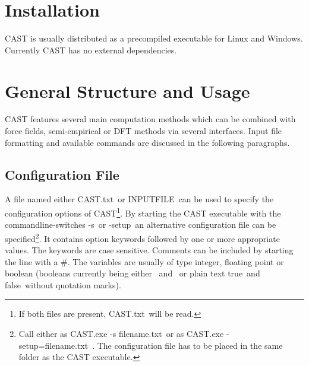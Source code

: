 \documentclass[10pt,a4paper]{article} %
\begin{document}
	\section{Installation}
	\ac{CAST} is usually distributed as a precompiled executable for Linux and Windows. Currently \ac{CAST} has no external dependencies.

	\newpage

	\section{General Structure and Usage}
	\ac{CAST} features several main computation methods which can be combined with force fields, semi-empirical or \ac{DFT} methods via several interfaces. Input file formatting and available commands are discussed in the following paragraphs.


	\subsection{Configuration File}
	A file named either \glqq CAST.txt\grqq~or \glqq INPUTFILE\grqq~can be used to specify the configuration options of \ac{CAST}\footnote{If both files are present, \glqq CAST.txt\grqq~will be read.}. By starting the CAST executable with the commandline-switches \glqq -s\grqq~or \glqq -setup\grqq~an alternative configuration file can be specified\footnote{Call either as \glqq CAST.exe -s filename.txt\grqq~or as \glqq CAST.exe -setup=filename.txt\grqq~. The configuration file has to be placed in the same folder as the CAST executable.}. It contains option keywords followed by one or more appropriate values. The keywords are case sensitive. Comments can be included by starting the line with a \glqq \#\grqq. The variables are usually of type integer, floating point or boolean (booleans currently being either \grqq~and \grqq~or plain text \glqq true\grqq~and \glqq false\grqq~without quotation marks).\\
\end{document}
